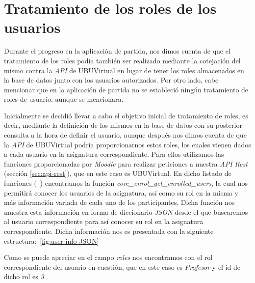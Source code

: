 
\section{Tratamiento de los roles de los usuarios}
Durante el progreso en la aplicación de partida, nos dimos cuenta de que el tratamiento de los roles podía también ser realizado mediante la cotejación del mismo contra la \textit{API} de UBUVirtual en lugar de tener los roles almacenados en la base de datos junto con los usuarios autorizados. Por otro lado, cabe mencionar que en la aplicación de partida no se estableció ningún tratamiento de roles de usuario, aunque se mencionara.

Inicialmente se decidió llevar a cabo el objetivo inicial de tratamiento de roles, es decir, mediante la definición de los mismos en la base de datos con su posterior consulta a la hora de definir el usuario, aunque después nos dimos cuenta de que la \textit{API} de UBUVirtual podría proporcionarnos estos roles, los cuales vienen dados a cada usuario en la asignatura correspondiente. Para ellos utilizamos las funciones proporcionadas por \textit{Moodle} para realizar peticiones a nuestra \textit{API Rest} (sección \ref{sec:api-rest}), que en este caso es UBUVirtual. En dicho listado de funciones (~\cite{moodle:web-service-api-functions}) encontramos la función \textit{core_enrol_get_enrolled_users}, la cual nos permitirá conocer los usuarios de la asignatura, así como su rol en la misma y más información variada de cada uno de los participantes. Dicha función nos muestra esta información en forma de diccionario \textit{JSON} desde el que buscaremos al usuario correspondiente para así conocer su rol en la asignatura correspondiente. Dicha información nos es presentada con la siguiente estructura:~\ref{fig:user-info-JSON}

Como se puede apreciar en el campo \textit{roles} nos encontramos con el rol correspondiente del usuario en cuestión, que en este caso es \textit{Profesor} y el id de dicho rol es \textit{3}


